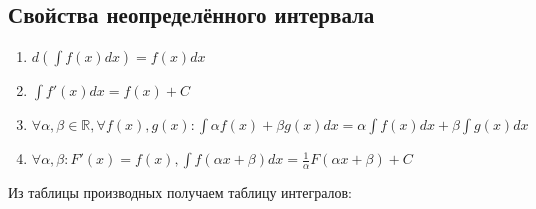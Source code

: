 \documentclass[oneside]{book}
\begin{document}
\begin{enumerate}
\begin{itemize}
\begin{enumerate}
\section[Свойства]{Свойства неопределённого интервала}
\begin{enumerate}
  \item $d(\int f(x) dx) = f(x) dx$
  \item $\int f'(x) dx = f(x) + C$
  \item $\forall \alpha, \beta \in \mathbb{R}, \forall f(x), g(x): \int \alpha f(x) + \beta g(x) dx = \alpha \int f(x) dx + \beta \int g(x) dx$
  \item $\forall \alpha, \beta: F'(x) = f(x), \int f(\alpha x + \beta) dx = \frac{1}{\alpha}F(\alpha x+\beta)+C$
\end{enumerate}
Из таблицы производных получаем таблицу интегралов:


\end{enumerate}
\end{itemize}
\end{enumerate}
\end{document}
